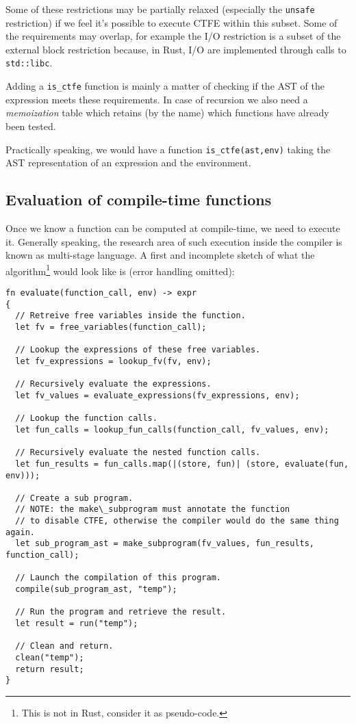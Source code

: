\documentclass[a4paper,11pt]{article}
\begin{document}
Some of these restrictions may be partially relaxed (especially the \lstinline{unsafe} restriction) if we feel it's possible to execute CTFE within this subset. Some of the requirements may overlap, for example the I/O restriction is a subset of the external block restriction because, in Rust, I/O are implemented through calls to \lstinline{std::libc}.

Adding a \lstinline{is_ctfe} function is mainly a matter of checking if the AST of the expression meets these requirements. In case of recursion we also need a \textit{memoization} table which retains (by the name) which functions have already been tested.

Practically speaking, we would have a function \lstinline{is_ctfe(ast,env)} taking the AST representation of an expression and the environment.

\subsection{Evaluation of compile-time functions}
\label{ctfe-evaluation}

Once we know a function can be computed at compile-time, we need to execute it. Generally speaking, the research area of such execution inside the compiler is known as multi-stage language\cite{DBLP:conf/gpce/CalcagnoTHL03,DBLP:conf/dagstuhl/Taha03}. A first and incomplete sketch of what the algorithm\footnote{This is not in Rust, consider it as pseudo-code.} would look like is (error handling omitted):

\begin{lstlisting}
fn evaluate(function_call, env) -> expr
{
  // Retreive free variables inside the function.
  let fv = free_variables(function_call);

  // Lookup the expressions of these free variables.
  let fv_expressions = lookup_fv(fv, env);

  // Recursively evaluate the expressions.
  let fv_values = evaluate_expressions(fv_expressions, env);

  // Lookup the function calls.
  let fun_calls = lookup_fun_calls(function_call, fv_values, env);

  // Recursively evaluate the nested function calls.
  let fun_results = fun_calls.map(|(store, fun)| (store, evaluate(fun, env)));

  // Create a sub program.
  // NOTE: the make\_subprogram must annotate the function
  // to disable CTFE, otherwise the compiler would do the same thing again.
  let sub_program_ast = make_subprogram(fv_values, fun_results, function_call);

  // Launch the compilation of this program.
  compile(sub_program_ast, "temp");

  // Run the program and retrieve the result.
  let result = run("temp");

  // Clean and return.
  clean("temp");
  return result;
}
\end{lstlisting}
\end{document}
